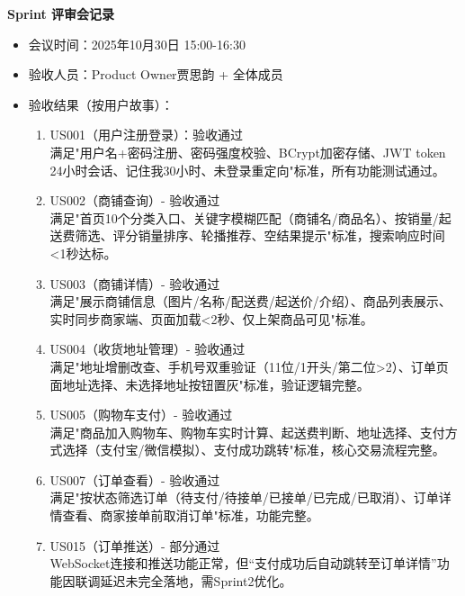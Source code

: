 \begin{levellist}
    \item \textbf{Sprint 评审会记录}
    \begin{itemize}
        \item 会议时间：2025年10月30日 15:00-16:30
        \item 验收人员：Product Owner贾思韵 + 全体成员
        \item 验收结果（按用户故事）：
              \begin{enumerate}
                  \item US001（用户注册登录）：验收通过 \\
                        满足"用户名+密码注册、密码强度校验、BCrypt加密存储、JWT token 24小时会话、记住我30小时、未登录重定向"标准，所有功能测试通过。
                  \item US002（商铺查询）- 验收通过 \\
                        满足"首页10个分类入口、关键字模糊匹配（商铺名/商品名）、按销量/起送费筛选、评分销量排序、轮播推荐、空结果提示"标准，搜索响应时间<1秒达标。
                  \item US003（商铺详情）- 验收通过 \\
                        满足"展示商铺信息（图片/名称/配送费/起送价/介绍）、商品列表展示、实时同步商家端、页面加载<2秒、仅上架商品可见"标准。
                  \item US004（收货地址管理）- 验收通过 \\
                        满足"地址增删改查、手机号双重验证（11位/1开头/第二位>2）、订单页面地址选择、未选择地址按钮置灰"标准，验证逻辑完整。
                  \item US005（购物车支付）- 验收通过 \\
                        满足"商品加入购物车、购物车实时计算、起送费判断、地址选择、支付方式选择（支付宝/微信模拟）、支付成功跳转"标准，核心交易流程完整。
                  \item US007（订单查看）- 验收通过 \\
                        满足"按状态筛选订单（待支付/待接单/已接单/已完成/已取消）、订单详情查看、商家接单前取消订单"标准，功能完整。
                  \item US015（订单推送）- 部分通过 \\
                        WebSocket连接和推送功能正常，但“支付成功后自动跳转至订单详情”功能因联调延迟未完全落地，需Sprint2优化。
              \end{enumerate}
    \end{itemize}


\end{levellist}
